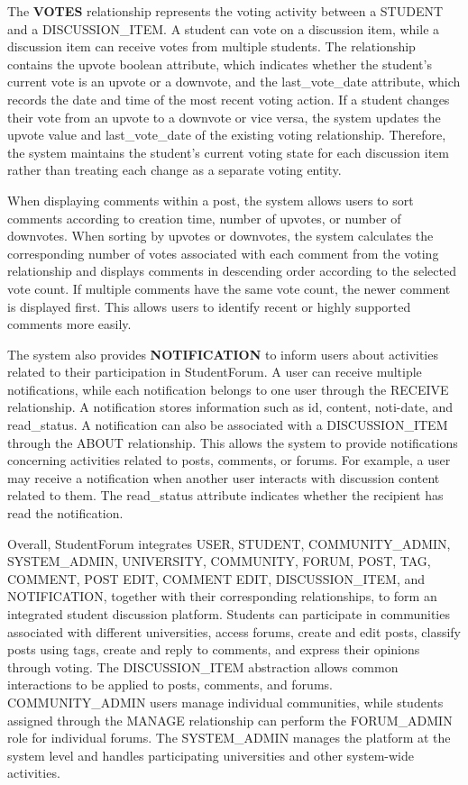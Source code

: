 The \textbf{VOTES} relationship represents the voting activity between a STUDENT and a DISCUSSION\_ITEM. A student can vote on a discussion item, while a discussion item can receive votes from multiple students. The relationship contains the upvote boolean attribute, which indicates whether the student's current vote is an upvote or a downvote, and the last\_vote\_date attribute, which records the date and time of the most recent voting action. If a student changes their vote from an upvote to a downvote or vice versa, the system updates the upvote value and last\_vote\_date of the existing voting relationship. Therefore, the system maintains the student's current voting state for each discussion item rather than treating each change as a separate voting entity.

When displaying comments within a post, the system allows users to sort comments according to creation time, number of upvotes, or number of downvotes. When sorting by upvotes or downvotes, the system calculates the corresponding number of votes associated with each comment from the voting relationship and displays comments in descending order according to the selected vote count. If multiple comments have the same vote count, the newer comment is displayed first. This allows users to identify recent or highly supported comments more easily.

The system also provides \textbf{NOTIFICATION }to inform users about activities related to their participation in StudentForum. A user can receive multiple notifications, while each notification belongs to one user through the RECEIVE relationship. A notification stores information such as id, content, noti-date, and read\_status. A notification can also be associated with a DISCUSSION\_ITEM through the ABOUT relationship. This allows the system to provide notifications concerning activities related to posts, comments, or forums. For example, a user may receive a notification when another user interacts with discussion content related to them. The read\_status attribute indicates whether the recipient has read the notification.

Overall, StudentForum integrates USER, STUDENT, COMMUNITY\_ADMIN, SYSTEM\_ADMIN, UNIVERSITY, COMMUNITY, FORUM, POST, TAG, COMMENT, POST EDIT, COMMENT EDIT, DISCUSSION\_ITEM, and NOTIFICATION, together with their corresponding relationships, to form an integrated student discussion platform. Students can participate in communities associated with different universities, access forums, create and edit posts, classify posts using tags, create and reply to comments, and express their opinions through voting. The DISCUSSION\_ITEM abstraction allows common interactions to be applied to posts, comments, and forums. COMMUNITY\_ADMIN users manage individual communities, while students assigned through the MANAGE relationship can perform the FORUM\_ADMIN role for individual forums. The SYSTEM\_ADMIN manages the platform at the system level and handles participating universities and other system-wide activities.

